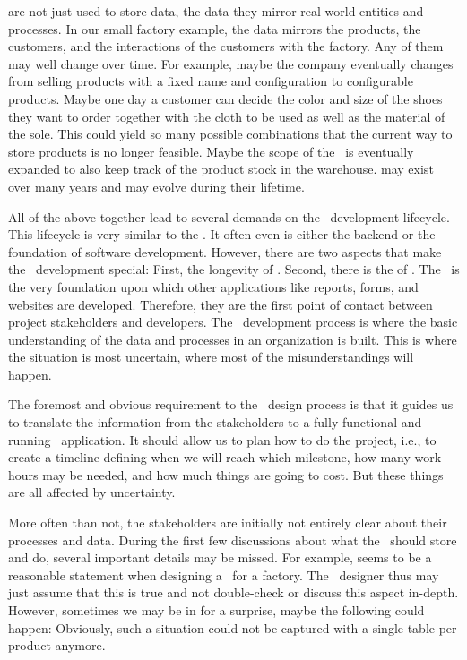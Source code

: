  are not just used to store data, the data they mirror real-world entities and processes.
In our small factory example, the data mirrors the products, the customers, and the interactions of the customers with the factory.
Any of them may well change over time.
For example, maybe the company eventually changes from selling products with a fixed name and configuration to configurable products.
Maybe one day a customer can decide the color and size of the shoes they want to order together with the cloth to be used as well as the material of the sole.
This could yield so many possible combinations that the current way to store products is no longer feasible.
Maybe the scope of the \db\ is eventually expanded to also keep track of the product stock in the warehouse.
 may exist over many years and may evolve during their lifetime.

All of the above together lead to several demands on the \db\ development lifecycle.
This lifecycle is very similar to the .
It often even is either the backend or the foundation of software development.
However, there are two aspects that make the \db\ development special:
First, the longevity of .
Second, there is the  of .
The \db\ is the very foundation upon which other applications like reports, forms, and websites are developed.
Therefore, they are the first point of contact between project stakeholders and developers.
The \db\ development process is where the basic understanding of the data and processes in an organization is built.
This is where the situation is most uncertain, where most of the misunderstandings will happen.

The foremost and obvious requirement to the \db\ design process is that it guides us to translate the information from the stakeholders to a fully functional and running \db\ application.
It should allow us to plan how to do the project, i.e., to create a timeline defining when we will reach which milestone, how many work hours may be needed, and how much things are going to cost.
But these things are all affected by uncertainty.

More often than not, the stakeholders are initially not entirely clear about their processes and data.
During the first few discussions about what the \db\ should store and do, several important details may be missed.
For example,  seems to be a reasonable statement when designing a \db\ for a factory.
The \db\ designer thus may just assume that this is true and not double-check or discuss this aspect in-depth.
However, sometimes we may be in for a surprise, maybe the following could happen:
Obviously, such a situation could not be captured with a single table per product anymore.

